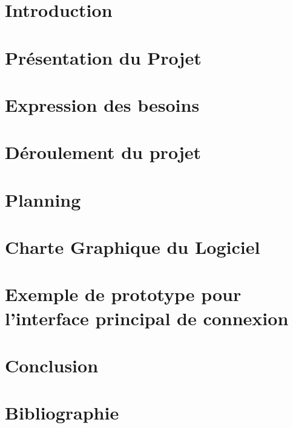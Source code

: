\documentclass[a4paper,11pt]{article}
\begin{document}



\newpage

\renewcommand{\contentsname}{Table des matières}
\tableofcontents
\newpage
\section{Introduction}

\newpage

\section{Présentation du Projet}

\newpage

\section{Expression des besoins}

\newpage

\section{Déroulement du projet}

\newpage

\section{Planning}

\newpage

\section{Charte Graphique du Logiciel}

\newpage

\section{Exemple de prototype pour l’interface principal de connexion}

\newpage

\section{Conclusion}

\newpage

\section{Bibliographie}

\newpage
\end{document}
